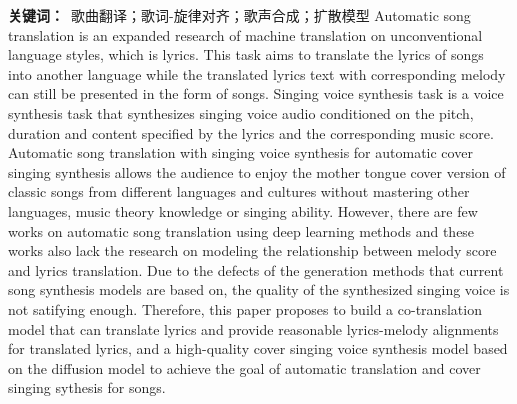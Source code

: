 \noindent\textbf{关键词：}~歌曲翻译；歌词-旋律对齐；歌声合成；扩散模型
Automatic song translation is an expanded research of machine translation on unconventional language styles, which is lyrics. This task aims to translate the lyrics of songs into another language while the translated lyrics text with corresponding melody can still be presented in the form of songs.
Singing voice synthesis task is a voice synthesis task that synthesizes singing voice audio conditioned on the pitch, duration and content specified by the lyrics and the corresponding music score. Automatic song translation with singing voice synthesis for automatic cover singing synthesis allows the audience to enjoy the mother tongue cover version of classic songs from different languages and cultures without mastering other languages, music theory knowledge or singing ability. However, there are few works on automatic song translation using deep learning methods and these works also lack the research on modeling the relationship between melody score and lyrics translation. Due to the defects of the generation methods that current song synthesis models are based on, the quality of the synthesized singing voice is not satifying enough.
Therefore, this paper proposes to build a co-translation model that can translate lyrics and provide reasonable lyrics-melody alignments for translated lyrics, and a high-quality cover singing voice synthesis model based on the diffusion model to achieve the goal of automatic translation and cover singing sythesis for songs.

